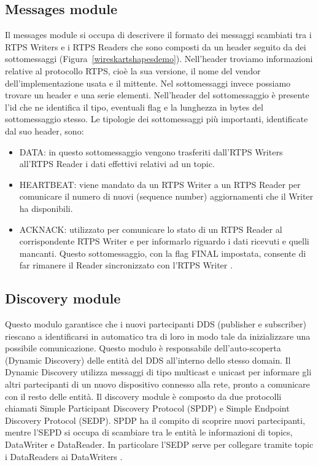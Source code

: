 \subsection{Messages module}
Il messages module si occupa di descrivere il formato dei messaggi scambiati
tra i RTPS Writers e i RTPS Readers che sono composti da un header
seguito da dei sottomessaggi (Figura~\ref{wireskartshapesdemo}). 
Nell'header troviamo informazioni relative al
protocollo RTPS, cioè la sua versione, il nome del vendor dell'implementazione
usata e il mittente. Nel sottomessaggi invece possiamo trovare un header
e una serie elementi. Nell'header del sottomessaggio
è presente l'id che ne
identifica il tipo, eventuali flag e la lunghezza in bytes 
del sottomessaggio stesso. Le tipologie dei sottomessaggi più importanti, 
identificate dal suo header, sono:
\begin{itemize}
    \item DATA: in questo sottomessaggio vengono trasferiti dall'RTPS Writers
    all'RTPS Reader i dati effettivi relativi ad un topic.
    \item HEARTBEAT: viene mandato da un RTPS Writer a un RTPS Reader per 
    comunicare il numero di nuovi (sequence number) aggiornamenti che il 
    Writer ha disponibili.
    \item ACKNACK: utilizzato per comunicare lo stato di un RTPS Reader 
    al corrispondente RTPS Writer e per informarlo riguardo i dati ricevuti
    e quelli mancanti. Questo sottomessaggio, con la flag FINAL 
    impostata, consente di far rimanere il Reader sincronizzato con l'RTPS
    Writer \cite{ddsrtps}.
\end{itemize} \label{Messages module}


\subsection{Discovery module}
Questo modulo garantisce che i nuovi partecipanti DDS (publisher e subscriber)
riescano a identificarsi in automatico tra di loro in modo tale da inizializzare una 
possibile comunicazione. Questo modulo è responsabile dell'auto-scoperta 
(Dynamic Discovery)
delle entità del DDS all'interno dello stesso domain. Il Dynamic Discovery
utilizza messaggi di tipo multicast e unicast per informare gli altri partecipanti
di un nuovo dispositivo connesso alla rete, pronto a comunicare con il
resto delle entità. Il discovery module è composto da due protocolli chiamati
Simple Participant Discovery Protocol (SPDP) e 
Simple Endpoint Discovery Protocol (SEDP). SPDP ha il compito di scoprire nuovi 
partecipanti, mentre l'SEPD si occupa di scambiare tra le entità le informazioni
di topics, DataWriter e DataReader. In particolare l'SEDP serve per collegare
tramite topic i DataReaders ai DataWriters \cite{ddsrtps}.
\label{Discovery module}

